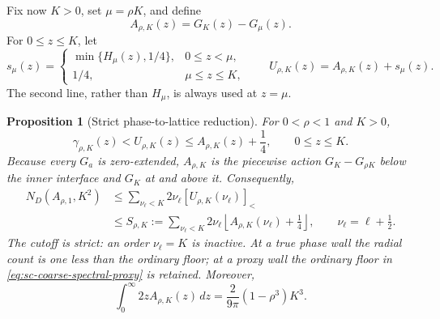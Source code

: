 \documentclass[11pt]{article}
\numberwithin{equation}{section}
\newtheorem{proposition}[theorem]{Proposition}
\theoremstyle{definition}
\theoremstyle{remark}
\begin{document}
Fix now \(K>0\), set \(\mu=\rho K\), and define
\begin{equation}
  A_{\rho,K}(z)=G_K(z)-G_\mu(z).
  \label{eq:sc-shell-action}
\end{equation}
For \(0\le z\le K\), let
\begin{equation}
  s_\mu(z)=
  \begin{cases}
  \min\{H_\mu(z),1/4\},&0\le z<\mu,\\
  1/4,&\mu\le z\le K,
  \end{cases}
  \qquad
  U_{\rho,K}(z)=A_{\rho,K}(z)+s_\mu(z).
  \label{eq:sc-optimized-proxy}
\end{equation}
The second line, rather than \(H_\mu\), is always used at \(z=\mu\).

\begin{proposition}[Strict phase-to-lattice reduction]
\label{prop:sc-phase-lattice}
For \(0<\rho<1\) and \(K>0\),
\begin{equation}
  \gamma_{\rho,K}(z)<U_{\rho,K}(z)
  \le A_{\rho,K}(z)+\frac14,
  \qquad 0\le z\le K.
  \label{eq:sc-pointwise-phase-proxy}
\end{equation}
Because every \(G_a\) is zero-extended, \(A_{\rho,K}\) is the piecewise
action \(G_K-G_{\rho K}\) below the inner interface and \(G_K\) at and
above it.  Consequently,
\begin{align}
  N_D(A_{\rho,1},K^2)
  &\le
  \sum_{\nu_\ell<K}2\nu_\ell
  [U_{\rho,K}(\nu_\ell)]_<
  \label{eq:sc-optimized-spectral-proxy}\\
  &\le
  S_{\rho,K}:=
  \sum_{\nu_\ell<K}2\nu_\ell
  \left\lfloor A_{\rho,K}(\nu_\ell)+\frac14\right\rfloor,
  \qquad \nu_\ell=\ell+\frac12.
  \label{eq:sc-coarse-spectral-proxy}
\end{align}
The cutoff is strict: an order \(\nu_\ell=K\) is inactive.  At a true phase
wall the radial count is one less than the ordinary floor; at a proxy wall
the ordinary floor in \eqref{eq:sc-coarse-spectral-proxy} is retained.
Moreover,
\begin{equation}
  \int_0^\infty2zA_{\rho,K}(z)\,dz
  =\frac{2}{9\pi}(1-\rho^3)K^3.
  \label{eq:sc-exact-action-integral}
\end{equation}
\end{proposition}
\end{document}
